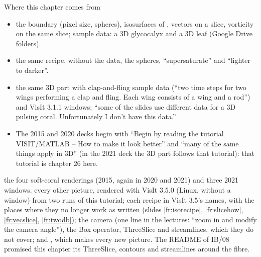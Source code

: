 \documentclass[aspectratio=169,11pt]{beamer}
\begin{document}
\begin{frame}{Where this chapter comes from}
\label{fr:sources}
\scriptsize
\begin{itemize}
  \item {} the boundary (pixel size, spheres), isosurfaces of , vectors on a slice, vorticity on the same slice; sample data: a 3D glycocalyx and a 3D leaf (Google Drive folders).
  \item {} the same recipe, without the data, the spheres, ``supersaturate'' and ``lighter to darker''.
  \item {} the same 3D part with clap-and-fling sample data (``two time steps for two wings performing a clap and fling. Each wing consists of a wing and a rod'') and VisIt 3.1.1 windows; ``some of the slides use different data for a 3D pulsing coral. Unfortunately I don't have this data.''
  \item The 2015 and 2020 decks begin with ``Begin by reading the tutorial VISIT/MATLAB -- How to make it look better'' and ``many of the same things apply in 3D'' (in the 2021 deck the 3D part follows that tutorial): that tutorial is chapter 26 here.
\end{itemize}
 the four soft-coral renderings (2015, again in 2020 and 2021) and three 2021 windows.  every other picture, rendered with VisIt 3.5.0 (Linux, without a window) from two runs of this tutorial; each recipe in VisIt 3.5's names, with the places where they no longer work as written (slides \ref{fr:isorecipe}, \ref{fr:slicehow}, \ref{fr:vecslice}, \ref{fr:twodb}); the camera (one line in the lectures: ``zoom in and modify the camera angle''), the Box operator, ThreeSlice and streamlines, which they do not cover; and , which makes every new picture. The README of IB/08 promised this chapter its ThreeSlice, contours and streamlines around the fibre.
\end{frame}
\end{document}
